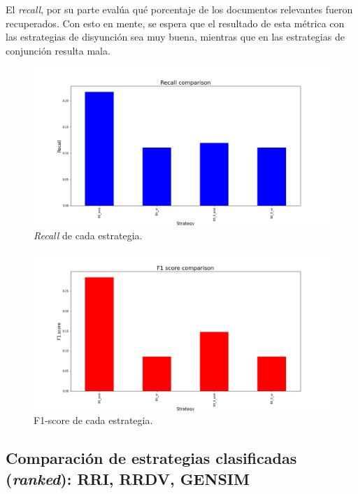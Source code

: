 El \textit{recall}, por su parte evalúa qué porcentaje de los documentos relevantes fueron recuperados. Con esto en mente, se espera que el resultado de esta métrica con las estrategias de disyunción sea muy buena, mientras que en las estrategias de conjunción resulta mala. 

\begin{figure}
    \centering
    \includegraphics[width=\textwidth]{results/images/BS_recall_comparison.png}
    \caption{\textit{Recall} de cada estrategia.}
    \label{fig:Recall}
\end{figure}

\begin{figure}
    \centering
    \includegraphics[width=\textwidth]{results/images/BS_f1_comparison.png}
    \caption{F1-score de cada estrategia.}
    \label{fig:F1-score}
\end{figure}


\subsection{Comparación de estrategias clasificadas (\textit{ranked}): RRI, RRDV, GENSIM}

